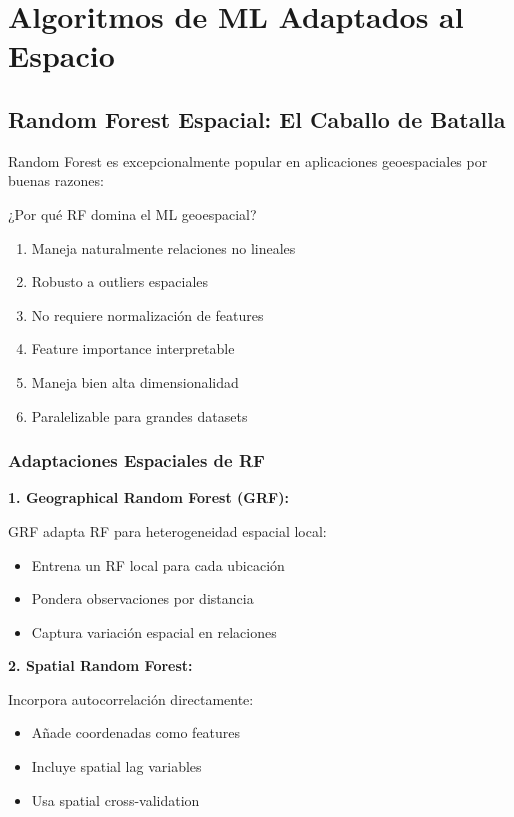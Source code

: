 \documentclass[12pt,a4paper]{article}
\begin{document}
\section{Algoritmos de ML Adaptados al Espacio}

\subsection{Random Forest Espacial: El Caballo de Batalla}

Random Forest es excepcionalmente popular en aplicaciones geoespaciales por buenas razones:

\begin{conceptbox}{¿Por qué RF domina el ML geoespacial?}
\begin{enumerate}
    \item Maneja naturalmente relaciones no lineales
    \item Robusto a outliers espaciales
    \item No requiere normalización de features
    \item Feature importance interpretable
    \item Maneja bien alta dimensionalidad
    \item Paralelizable para grandes datasets
\end{enumerate}
\end{conceptbox}

\subsubsection{Adaptaciones Espaciales de RF}

\textbf{1. Geographical Random Forest (GRF):}

GRF adapta RF para heterogeneidad espacial local:
\begin{itemize}
    \item Entrena un RF local para cada ubicación
    \item Pondera observaciones por distancia
    \item Captura variación espacial en relaciones
\end{itemize}

\textbf{2. Spatial Random Forest:}

Incorpora autocorrelación directamente:
\begin{itemize}
    \item Añade coordenadas como features
    \item Incluye spatial lag variables
    \item Usa spatial cross-validation
\end{itemize}
\end{document}
